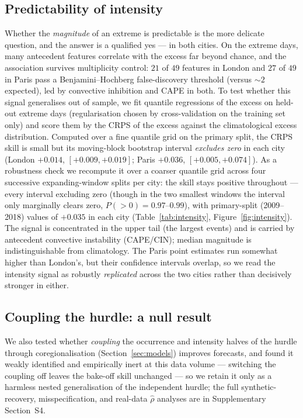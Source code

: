 \documentclass[11pt,a4paper]{article}
\begin{document}
\subsection{Predictability of intensity}\label{sec:res-int}
Whether the \emph{magnitude} of an extreme is predictable is the more delicate
question, and the answer is a qualified yes --- in both cities. On the extreme
days, many antecedent features correlate with the excess far beyond chance, and
the association survives multiplicity control: $21$ of $49$ features in London and
$27$ of $49$ in Paris pass a Benjamini--Hochberg false-discovery threshold (versus
$\sim2$ expected), led by convective inhibition and CAPE in both. To test whether
this signal generalises out of sample, we fit quantile regressions of the excess
on held-out extreme days (regularisation chosen by cross-validation on the
training set only) and score them by the CRPS of the excess against the
climatological excess distribution. Computed over a fine quantile grid on the
primary split, the CRPS skill is small but its moving-block bootstrap interval
\emph{excludes zero} in each city (London $+0.014$, $[+0.009,+0.019]$; Paris
$+0.036$, $[+0.005,+0.074]$). As a robustness check we recompute it over a coarser
quantile grid across four successive expanding-window splits per city: the skill
stays positive throughout --- every interval excluding zero (though in the two smallest windows the interval only marginally clears zero, $P(>0)=0.97$--$0.99$), with primary-split
(2009--2018) values of $+0.035$ in each city (Table~\ref{tab:intensity},
Figure~\ref{fig:intensity}). The signal is concentrated in the upper tail (the
largest events) and is carried by antecedent convective instability (CAPE/CIN);
median magnitude is indistinguishable from climatology. The Paris point estimates
run somewhat higher than London's, but their confidence intervals overlap, so we
read the intensity signal as robustly \emph{replicated} across the two cities
rather than decisively stronger in either.



\subsection{Coupling the hurdle: a null result}\label{sec:res-synth}
We also tested whether \emph{coupling} the occurrence and intensity halves of the
hurdle through coregionalisation (Section~\ref{sec:models}) improves forecasts,
and found it weakly identified and empirically inert at this data volume ---
switching the coupling off leaves the bake-off skill unchanged --- so we retain it
only as a harmless nested generalisation of the independent hurdle; the full
synthetic-recovery, misspecification, and real-data $\widehat\rho$ analyses are in
Supplementary Section~S4.
\end{document}
